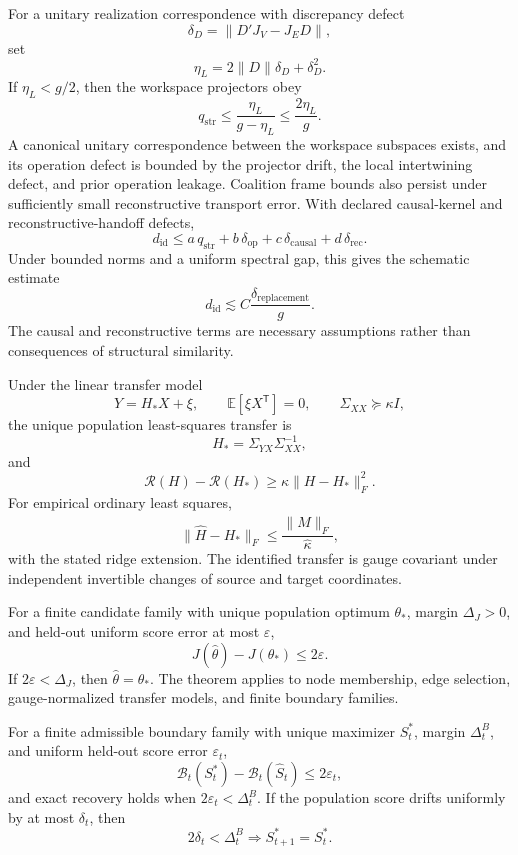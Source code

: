 
For a unitary realization correspondence with discrepancy defect
\[
\delta_D=\|D'J_V-J_ED\|,
\]
set
\[
\eta_L=2\|D\|\delta_D+\delta_D^2.
\]
If \(\eta_L<g/2\), then the workspace projectors obey
\[
\boxed{
q_{\mathrm{str}}
\leq
\frac{\eta_L}{g-\eta_L}
\leq
\frac{2\eta_L}{g}.
}
\]
A canonical unitary correspondence between the workspace subspaces exists,
and its operation defect is bounded by the projector drift, the local
intertwining defect, and prior operation leakage. Coalition frame bounds also
persist under sufficiently small reconstructive transport error. With declared
causal-kernel and reconstructive-handoff defects,
\[
\boxed{
d_{\mathrm{id}}
\leq
 a\,q_{\mathrm{str}}
+b\,\delta_{\mathrm{op}}
+c\,\delta_{\mathrm{causal}}
+d\,\delta_{\mathrm{rec}}.
}
\]
Under bounded norms and a uniform spectral gap, this gives the schematic
estimate
\[
d_{\mathrm{id}}
\lesssim
C\frac{\delta_{\mathrm{replacement}}}{g}.
\]
The causal and reconstructive terms are necessary assumptions rather than
consequences of structural similarity.



Under the linear transfer model
\[
Y=H_*X+\xi,
\qquad
\mathbb E[\xi X^{\mathsf T}]=0,
\qquad
\Sigma_{XX}\succeq\kappa I,
\]
the unique population least-squares transfer is
\[
\boxed{H_*=\Sigma_{YX}\Sigma_{XX}^{-1},}
\]
and
\[
\mathcal R(H)-\mathcal R(H_*)
\geq
\kappa\|H-H_*\|_F^2.
\]
For empirical ordinary least squares,
\[
\|\widehat H-H_*\|_F
\leq
\frac{\|\widehat M\|_F}{\widehat\kappa},
\]
with the stated ridge extension. The identified transfer is gauge covariant
under independent invertible changes of source and target coordinates.


For a finite candidate family with unique population optimum \(\theta_*\),
margin \(\Delta_J>0\), and held-out uniform score error at most \(\varepsilon\),
\[
\boxed{
J(\widehat\theta)-J(\theta_*)\leq2\varepsilon.
}
\]
If \(2\varepsilon<\Delta_J\), then \(\widehat\theta=\theta_*\). The theorem
applies to node membership, edge selection, gauge-normalized transfer models,
and finite boundary families.


For a finite admissible boundary family with unique maximizer \(S_t^*\), margin
\(\Delta_t^B\), and uniform held-out score error \(\varepsilon_t\),
\[
\mathcal B_t(S_t^*)-
\mathcal B_t(\widehat S_t)
\leq2\varepsilon_t,
\]
and exact recovery holds when \(2\varepsilon_t<\Delta_t^B\). If the population
score drifts uniformly by at most \(\delta_t\), then
\[
2\delta_t<\Delta_t^B
\Longrightarrow
S_{t+1}^*=S_t^*.
\]

